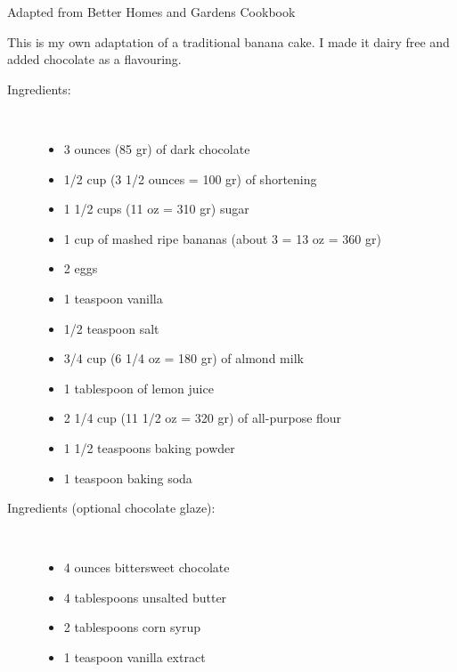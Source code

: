 \documentclass[11pt,letterpaper]{article}
\begin{document}


{\hspace{2in} Adapted from Better Homes and Gardens Cookbook}

\vspace{0.5in}

This is my own adaptation of a traditional banana cake. I made it dairy free and added chocolate as a flavouring.
\begin{description}

\item[Ingredients:]\ \\
	\begin{itemize}
	\item 3 ounces (85 gr) of dark chocolate
	\item 1/2 cup (3 1/2 ounces =  100 gr) of shortening
	\item 1 1/2 cups (11 oz = 310 gr) sugar
	\item 1 cup of mashed ripe bananas (about 3 = 13 oz = 360 gr)
	\item 2 eggs
	\item 1 teaspoon vanilla
	\item 1/2 teaspoon salt
	\item 3/4 cup (6 1/4 oz = 180 gr) of almond milk 
	\item 1 tablespoon of lemon juice
        \item 2 1/4 cup (11 1/2 oz = 320 gr) of all-purpose flour
	\item 1 1/2 teaspoons baking powder
	\item 1 teaspoon baking soda
	\end{itemize}
	
\item[Ingredients (optional chocolate glaze):]\ \\
	\begin{itemize}
	\item 4 ounces bittersweet chocolate
	\item 4 tablespoons unsalted butter
	\item 2 tablespoons corn syrup
	\item 1 teaspoon vanilla extract
	\end{itemize}
	

\end{description}
\end{document}
